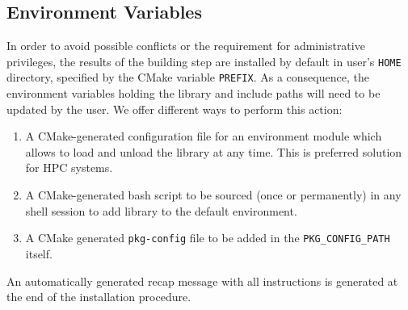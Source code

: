 \documentclass[edipack_sp.tex]{subfiles}
\begin{document}
\subsection{Environment Variables}\label{sSecInstallOSloading}
In order to avoid possible conflicts or the requirement for administrative
privileges, the results of the building step are installed by default in user's {\tt HOME}
directory, specified by the CMake variable {\tt PREFIX}.
As a consequence, the environment variables holding the library and include paths will need to be updated by the user.
We offer different ways to perform this action:
\begin{enumerate}
\item  A CMake-generated configuration file for an environment module
  which allows to load and unload the library at any time. This is
  preferred solution for HPC systems. 
\item A CMake-generated bash script to be sourced (once or
  permanently) in any shell session to add \NAME library to the
  default environment.
\item A CMake generated {\tt pkg-config} file to be added in
  the {\tt PKG\_CONFIG\_PATH} itself.  
\end{enumerate}
An automatically generated recap message with all instructions is
generated at the end of the installation procedure. 

\ifSubfilesClassLoaded{
  
}{}
\end{document}
